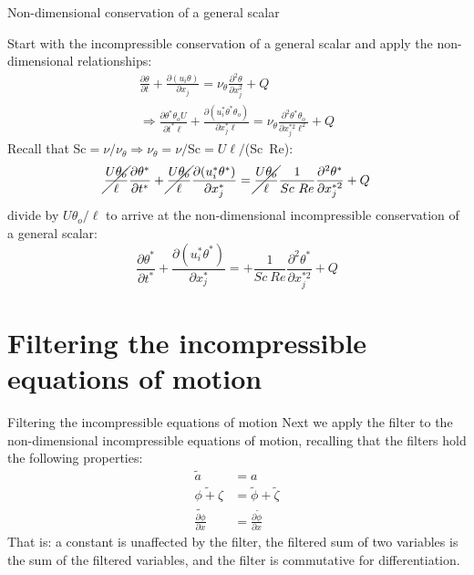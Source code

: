 \begin{frame}{Non-dimensional conservation of a general scalar}

Start with the incompressible conservation of a general scalar and apply the non-dimensional relationships:
\begin{gather*}
\frac{\partial \theta}{\partial t} + \frac{\partial (u_i \theta)}{\partial x_j} = \nu_{\theta}\frac{\partial^2 \theta}{\partial x_j^2} + Q\\
\Rightarrow \frac{\partial \theta^* \theta_o U}{\partial t^* \ell} + \frac{\partial (u_i^* \theta^* \theta_o)}{\partial x_j^* \ell} = \nu_{\theta}\frac{\partial^2 \theta^* \theta_o}{\partial x_j^{*2} \ell^2} + Q
\end{gather*}
Recall that Sc$=\nu/\nu_{\theta}\Rightarrow \nu_{\theta}=\nu/$Sc$=U\ell/$(Sc\ Re):
$$
\cancel{\frac{U \theta_o}{\ell}}\frac{\partial \theta^*}{\partial t^*} + \cancel{\frac{U \theta_o}{\ell}}\frac{\partial (u_i^*\theta^*)}{\partial x_j^*} =  \cancel{\frac{U\theta_o}{\ell}}\frac{1}{Sc\ Re} \frac{\partial^2 \theta^*}{\partial x_j^{*2}} + Q
$$
divide by $U\theta_o/\ell$ to arrive at the non-dimensional incompressible conservation of a general scalar:
$$\boxed{\frac{\partial \theta^*}{\partial t^*} + \frac{\partial (u_i^* \theta^*)}{\partial x_j^*} = + \frac{1}{Sc\ Re} \frac{\partial^2 \theta^*}{\partial x_j^{*2}} + Q}$$
\end{frame}

\section{Filtering the incompressible equations of motion} %
\begin{frame}{Filtering the incompressible equations of motion}
Next we apply the filter to the non-dimensional incompressible equations of motion, recalling that the filters hold the following properties:
\begin{align*}
\tilde a &= a\\
\widetilde{\phi + \zeta} &= \tilde \phi + \tilde \zeta\\
\widetilde{\frac{\partial \phi}{\partial x}} &= 	\frac{\partial \tilde \phi}{\partial x}
\end{align*}
That is: a constant is unaffected by the filter, the filtered sum of two variables is the sum of the filtered variables, and the filter is commutative for differentiation.

\end{frame}

